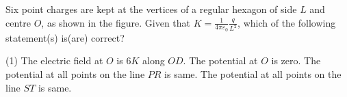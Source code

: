 
\item Six point charges are kept at the vertices of a regular hexagon of side $L$ and centre $O$, as shown in the figure. Given that $K = \frac{1}{4\pi\varepsilon_0} \frac{q}{L^2}$, which of the following statement(s) is(are) correct?
    \begin{center}
    \end{center}
    \begin{tasks}(1)
        \task The electric field at $O$ is $6K$ along $OD$.
        \task The potential at $O$ is zero.
        \task The potential at all points on the line $PR$ is same.
        \task The potential at all points on the line $ST$ is same.
    \end{tasks}

